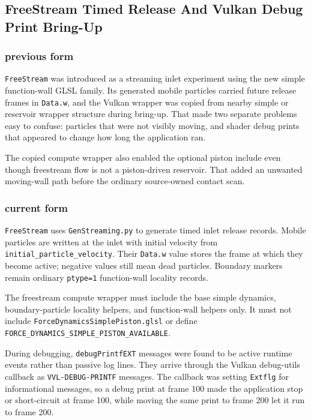\subsection{FreeStream Timed Release And Vulkan Debug Print Bring-Up}

\subsubsection{previous form}

\texttt{FreeStream} was introduced as a streaming inlet experiment using the
new simple function-wall GLSL family.  Its generated mobile particles carried
future release frames in \texttt{Data.w}, and the Vulkan wrapper was copied
from nearby simple or reservoir wrapper structure during bring-up.  That made
two separate problems easy to confuse: particles that were not visibly moving,
and shader debug prints that appeared to change how long the application ran.

The copied compute wrapper also enabled the optional piston include even
though freestream flow is not a piston-driven reservoir.  That added an
unwanted moving-wall path before the ordinary source-owned contact scan.

\subsubsection{current form}

\texttt{FreeStream} uses \texttt{GenStreaming.py} to generate timed inlet
release records.  Mobile particles are written at the inlet with initial
velocity from \texttt{initial\_particle\_velocity}.  Their
\texttt{Data.w} value stores the frame at which they become active; negative
values still mean dead particles.  Boundary markers remain ordinary
\texttt{ptype=1} function-wall locality records.

The freestream compute wrapper must include the base simple dynamics,
boundary-particle locality helpers, and function-wall helpers only.  It must
not include \texttt{ForceDynamicsSimplePiston.glsl} or define
\texttt{FORCE\_DYNAMICS\_SIMPLE\_PISTON\_AVAILABLE}.

During debugging, \texttt{debugPrintfEXT} messages were found to be active
runtime events rather than passive log lines.  They arrive through the Vulkan
debug-utils callback as \texttt{VVL-DEBUG-PRINTF} messages.  The callback was
setting \texttt{Extflg} for informational messages, so a debug print at frame
100 made the application stop or short-circuit at frame 100, while moving the
same print to frame 200 let it run to frame 200.

